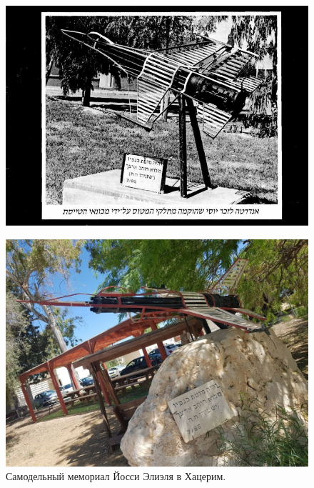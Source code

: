 \begin{figure}[h!tb] 
	\centering\includegraphics[scale=0.6]{History_Yosya/J3-qpraOxxo.jpg}
\end{figure}
\begin{figure}[h!tb] 
	\centering\includegraphics[scale=0.4]{History_Yosya/-O0VmNmFlaU.jpg}
	\caption{Самодельный мемориал Йосси Элиэля в Хацерим.}%
\end{figure}

